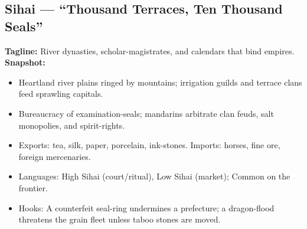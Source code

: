 \documentclass[11pt]{article}
\begin{document}
\subsection*{Sihai — “Thousand Terraces, Ten Thousand Seals”}
\textbf{Tagline:} River dynasties, scholar-magistrates, and calendars that bind empires.\\
\textbf{Snapshot:}
\begin{itemize}
  \item Heartland river plains ringed by mountains; irrigation guilds and terrace clans feed sprawling capitals.
  \item Bureaucracy of examination-seals; mandarins arbitrate clan feuds, salt monopolies, and spirit-rights.
  \item Exports: tea, silk, paper, porcelain, ink-stones. Imports: horses, fine ore, foreign mercenaries.
  \item Languages: High Sihai (court/ritual), Low Sihai (market); Common on the frontier.
  \item Hooks: A counterfeit seal-ring undermines a prefecture; a dragon-flood threatens the grain fleet unless taboo stones are moved.
\end{itemize}
\end{document}
